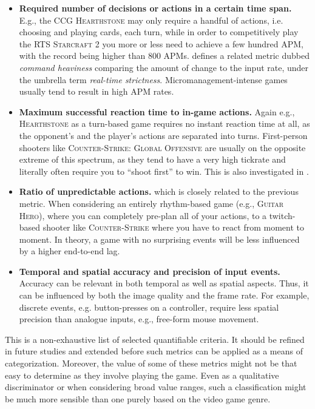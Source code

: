  \begin{itemize}
    \item \textbf{Required number of decisions or actions in a certain time span.} E.g., the \gls{CCG} \textsc{Hearthstone} may only require a handful of actions, i.e. choosing and playing cards, each turn, while in order to competitively play the \gls{RTS} \textsc{Starcraft 2} you more or less need to achieve a few hundred \gls{APM}, with the record being higher than $800$ \glspl{APM}. \cite{6404025} defines a related metric dubbed \textit{command heaviness} comparing the amount of change to the input rate, under the umbrella term \textit{real-time strictness}. %
    Micromanagement-intense games usually tend to result in high APM rates.

    \item \textbf{Maximum successful reaction time to in-game actions.} Again e.g., \textsc{Hearthstone} as a turn-based game requires no instant reaction time at all, as the opponent's and the player's actions are separated into turns. First-person shooters like \textsc{Counter-Strike: Global Offensive} are usually on the opposite extreme of this spectrum, as they tend to have a very high tickrate and literally often require you to ``shoot first'' to win. This is also investigated in \cite{Claypool:2006:LPA:1167838.1167860}.

    \item \textbf{Ratio of unpredictable actions.} which is closely related to the previous metric. When considering an entirely rhythm-based game (e.g., \textsc{Guitar Hero}), where you can completely pre-plan all of your actions, to a twitch-based shooter like \textsc{Counter-Strike} where you have to react from moment to moment. In theory, a game with no surprising events will be less influenced by a higher end-to-end lag.

    \item \textbf{Temporal and spatial accuracy and precision of input events.} Accuracy can be relevant in both temporal as well as spatial aspects.
    Thus, it can be influenced by both the image quality and the frame rate.
    For example, discrete events, e.g. button-presses on a controller, require less spatial precision than analogue inputs, e.g., free-form mouse movement.
\end{itemize}

This is a non-exhaustive list of selected quantifiable criteria.
It should be refined in future studies and extended before such metrics can be applied as a means of categorization.
Moreover, the value of some of these metrics might not be that easy to determine as they involve playing the game. Even as a qualitative discriminator or when considering broad value ranges, such a classification might be much more sensible than one purely based on the video game genre.